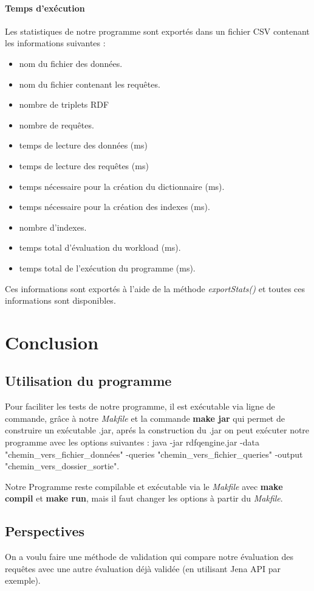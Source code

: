 \documentclass[12pt,titlepage]{article}
\begin{document}
\paragraph{Temps d'exécution}
Les statistiques de notre programme sont exportés dans un fichier CSV contenant les informations suivantes : 

\begin{itemize}
  \item nom du fichier des données.
  \item nom du fichier contenant les requêtes.
  \item nombre de triplets RDF
  \item nombre de requêtes.
  \item temps de lecture des données (ms) 
  \item temps de lecture des requêtes (ms)
  \item temps nécessaire pour la création du dictionnaire (ms).
  \item temps nécessaire pour la création des indexes (ms). 
  \item nombre d'indexes.
  \item temps total d'évaluation du workload (ms). 
  \item temps total de l'exécution du programme (ms).

\end{itemize}

Ces informations sont exportés à l'aide de la méthode \textit{exportStats()} et toutes ces informations sont disponibles.

\section{Conclusion}

\subsection{Utilisation du programme}
Pour faciliter les tests de notre programme, il est exécutable via ligne de commande, grâce à notre \textit{Makfile} et la commande \textbf{make jar} qui permet de construire un exécutable .jar, aprés la construction du .jar on peut exécuter notre programme avec les options suivantes : 
java -jar rdfqengine.jar -data "chemin\_vers\_fichier\_données" -queries "chemin\_vers\_fichier\_queries" -output "chemin\_vers\_dossier\_sortie".

Notre Programme reste compilable et exécutable via le \textit{Makfile} avec \textbf{make compil} et \textbf{make run}, mais il faut changer les options à partir du \textit{Makfile}.


\subsection{Perspectives}
On a voulu faire une méthode de validation qui compare notre évaluation des requêtes avec une autre évaluation déjà validée (en utilisant Jena API par exemple).
\end{document}
